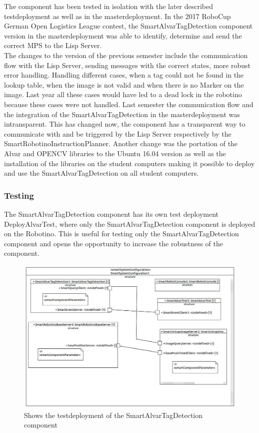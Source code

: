 The component has been tested in isolation with the later described testdeployment as well as in the masterdeployment. In the 2017 RoboCup German Open Logistics League contest, the SmartAlvarTagDetection component version in the masterdeployment was able to identify, determine and send the correct MPS to the Lisp Server. \\
The changes to the version of the previous semester include the communication flow with the Lisp Server, sending messages with the correct states, more robust error handling. Handling different cases, when a tag could not be found in the lookup table, when the image is not valid and when there is no Marker on the image. Last year all these cases would have led to a dead lock in the robotino because these cases were not handled. Last semester the communication flow and the integration of the SmartAlvarTagDetection in the masterdeployment was intransparent. This has changed now, the component has a transparent way to communicate with and be triggered by the Lisp Server respectively by the SmartRobotinoInstructionPlanner. Another change was the portation of the Alvar and OPENCV libraries to the Ubuntu 16.04 version as well as the installation of the libraries on the student computers making it possible to deploy and use the SmartAlvarTagDetection on all student computers.

\subsubsection{Testing}

The SmartAlvarTagDetection component has its own test deployment DeployAlvarTest, where only the SmartAlvarTagDetection component is deployed on the Robotino. This is useful for testing only the SmartAlvarTagDetection component and opens the opportunity to increase the robustness of the component. \\

\begin{figure}[h]
\centering
\includegraphics[scale=0.3]{pic/DeployAlvarTest.jpg}
\caption{Shows the testdeployment of the SmartAlvarTagDetection component}
\label{fig:smartAlvarDeploy}
\end{figure}

